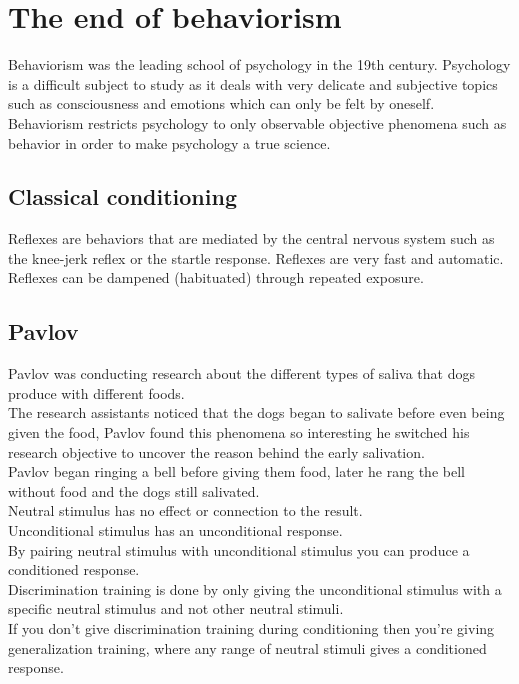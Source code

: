 \documentclass[11pt]{article}
\begin{document}
	\thispagestyle{empty}
	\tableofcontents
	
	\newpage
	\setcounter{page}{1}
	\section{The end of behaviorism}
	Behaviorism was the leading school of psychology in the 19th century. Psychology is a difficult subject to study as it deals with very delicate and subjective topics such as consciousness and emotions which can only be felt by oneself.\\
	Behaviorism restricts psychology to only observable objective phenomena such as behavior in order to make psychology a true science.
	\subsection{Classical conditioning}
	Reflexes are behaviors that are mediated by the central nervous system such as the knee-jerk reflex or the startle response. Reflexes are very fast and automatic.\\
	Reflexes can be dampened (habituated) through repeated exposure.
	\subsection{Pavlov}
	Pavlov was conducting research about the different types of saliva that dogs produce with different foods.\\
	The research assistants noticed that the dogs began to salivate before even being given the food, Pavlov found this phenomena so interesting he switched his research objective to uncover the reason behind the early salivation.\\
	Pavlov began ringing a bell before giving them food, later he rang the bell without food and the dogs still salivated.\\
	Neutral stimulus has no effect or connection to the result.\\
	Unconditional stimulus has an unconditional response.\\
	By pairing neutral stimulus with unconditional stimulus you can produce a conditioned response.\\
	Discrimination training is done by only giving the unconditional stimulus with a specific neutral stimulus and not other neutral stimuli.\\
	If you don't give discrimination training during conditioning then you're giving generalization training, where any range of neutral stimuli gives a conditioned response.
	
\end{document}
